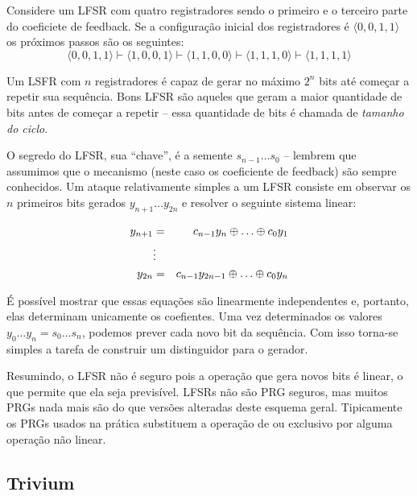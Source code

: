 \begin{example}
  Considere um LFSR com quatro registradores sendo o primeiro e o terceiro parte do coeficiete de feedback.
Se a configuração inicial dos registradores é $\langle 0,0,1,1 \rangle$ os próximos passos são os seguintes:
\begin{displaymath}
  \langle 0,0,1,1 \rangle \vdash
  \langle 1,0,0,1 \rangle \vdash 
  \langle 1,1,0,0 \rangle \vdash
  \langle 1,1,1,0 \rangle \vdash
  \langle 1,1,1,1 \rangle
\end{displaymath}
\end{example}

Um LSFR com $n$ registradores é capaz de gerar no máximo $2^n$ bits até começar a repetir sua sequência.
Bons LFSR são aqueles que geram a maior quantidade de bits antes de começar a repetir -- essa quantidade de bits é chamada de {\em tamanho do ciclo}.

O segredo do LFSR, sua ``chave'', é a semente $s_{n-1} \dots s_0$ -- lembrem que assumimos que o mecanismo (neste caso os coeficiente de feedback) são sempre conhecidos. 
Um ataque relativamente simples a um LFSR consiste em observar os $n$ primeiros bits gerados $y_{n+1} \dots y_{2n}$ e resolver o seguinte sistema linear:

\begin{eqnarray*}
  y_{n+1} &    =   & c_{n-1}y_n \xor \dots \xor c_0 y_1\\
         & \vdots &  \\
  y_{2n}  &    =   & c_{n-1}y_{2n-1} \xor \dots \xor c_0 y_n\\      
\end{eqnarray*}


É possível mostrar que essas equações são linearmente independentes e, portanto, elas determinam unicamente os coefientes.
Uma vez determinados os valores $y_0 \dots y_n = s_0 \dots s_n$, podemos prever cada novo bit da sequência.
Com isso torna-se simples a tarefa de construir um distinguidor para o gerador.

Resumindo, o LFSR não é seguro pois a operação que gera novos bits é linear, o que permite que ela seja previsível.
LFSRs não são PRG seguros, mas muitos PRGs nada mais são do que versões alteradas deste esquema geral.
Tipicamente os PRGs usados na prática substituem a operação de ou exclusivo por alguma operação não linear.

\subsection{Trivium}
\label{sec:trivium}


